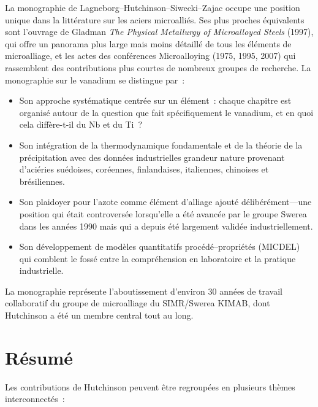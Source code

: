 \documentclass[11pt,a4paper]{article}
\begin{document}
La monographie de Lagneborg--Hutchinson--Siwecki--Zajac occupe une
position unique dans la litt\'erature sur les aciers microalli\'es.  Ses
plus proches \'equivalents sont l'ouvrage de Gladman \emph{The Physical
Metallurgy of Microalloyed Steels} (1997), qui offre un panorama plus
large mais moins d\'etaill\'e de tous les \'el\'ements de microalliage,
et les actes des conf\'erences Microalloying (1975, 1995, 2007) qui
rassemblent des contributions plus courtes de nombreux groupes de
recherche.  La monographie sur le vanadium se distingue par~:
\begin{itemize}
  \item Son approche syst\'ematique centr\'ee sur un \'el\'ement~: chaque
    chapitre est organis\'e autour de la question \og que fait
    sp\'ecifiquement le vanadium, et en quoi cela diff\`ere-t-il du Nb
    et du Ti~? \fg{}
  \item Son int\'egration de la thermodynamique fondamentale et de la
    th\'eorie de la pr\'ecipitation avec des donn\'ees industrielles
    grandeur nature provenant d'aci\'eries su\'edoises, cor\'eennes,
    finlandaises, italiennes, chinoises et br\'esiliennes.
  \item Son plaidoyer pour l'azote comme \'el\'ement d'alliage ajout\'e
    d\'elib\'er\'ement---une position qui \'etait controvers\'ee
    lorsqu'elle a \'et\'e avanc\'ee par le groupe Swerea dans les
    ann\'ees 1990 mais qui a depuis \'et\'e largement valid\'ee
    industriellement.
  \item Son d\'eveloppement de mod\`eles quantitatifs
    proc\'ed\'e--propri\'et\'es (MICDEL) qui comblent le foss\'e entre la
    compr\'ehension en laboratoire et la pratique industrielle.
\end{itemize}

La monographie repr\'esente l'aboutissement d'environ 30 ann\'ees de
travail collaboratif du groupe de microalliage du
SIMR/Swerea KIMAB, dont Hutchinson a \'et\'e un membre central tout au
long.

\section*{R\'esum\'e}

Les contributions de Hutchinson peuvent \^etre regroup\'ees en plusieurs
th\`emes interconnect\'es~:
\end{document}
